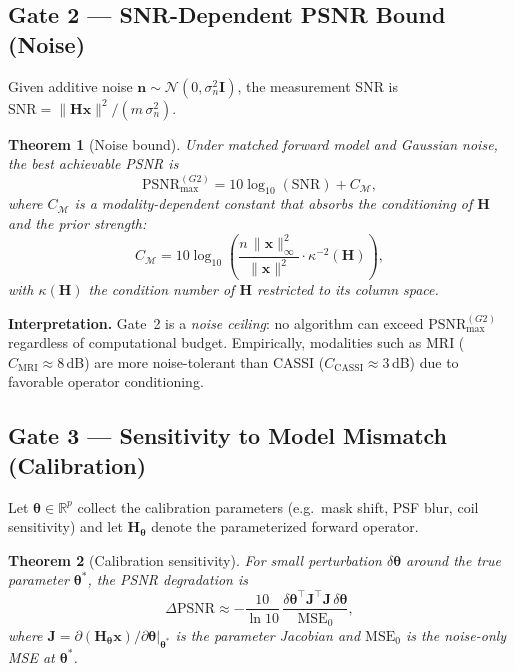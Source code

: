 \documentclass[11pt]{article}
\newtheorem{theorem}{Theorem}
\theoremstyle{definition}
\begin{document}
\subsection{Gate 2 --- SNR-Dependent PSNR Bound (Noise)}

Given additive noise $\mathbf{n}\sim\mathcal{N}(0,\sigma_n^2\mathbf{I})$,
the measurement SNR is $\mathrm{SNR} = \|\mathbf{H}\mathbf{x}\|^2 /
(m\,\sigma_n^2)$.

\begin{theorem}[Noise bound]
Under matched forward model and Gaussian noise, the best achievable PSNR is
\begin{equation}
  \mathrm{PSNR}_{\max}^{(G2)}
  = 10\log_{10}(\mathrm{SNR}) + C_{\mathcal{M}},
  \label{eq:gate2}
\end{equation}
where $C_{\mathcal{M}}$ is a modality-dependent constant that absorbs
the conditioning of $\mathbf{H}$ and the prior strength:
\begin{equation}
  C_{\mathcal{M}}
  = 10\log_{10}\!\left(
      \frac{n\,\|\mathbf{x}\|_\infty^2}{\|\mathbf{x}\|^2}
      \cdot \kappa^{-2}(\mathbf{H})
    \right),
\end{equation}
with $\kappa(\mathbf{H})$ the condition number of $\mathbf{H}$ restricted to
its column space.
\end{theorem}

\noindent\textbf{Interpretation.}
Gate~2 is a \emph{noise ceiling}: no algorithm can exceed
$\mathrm{PSNR}_{\max}^{(G2)}$ regardless of computational budget.
Empirically, modalities such as MRI ($C_{\mathrm{MRI}}\approx 8$\,dB) are more
noise-tolerant than CASSI ($C_{\mathrm{CASSI}}\approx 3$\,dB) due to
favorable operator conditioning.

\subsection{Gate 3 --- Sensitivity to Model Mismatch (Calibration)}

Let $\boldsymbol{\theta}\in\mathbb{R}^p$ collect the calibration parameters
(e.g.\ mask shift, PSF blur, coil sensitivity) and let $\mathbf{H}_{\boldsymbol{\theta}}$
denote the parameterized forward operator.

\begin{theorem}[Calibration sensitivity]
For small perturbation $\delta\boldsymbol{\theta}$ around the true parameter
$\boldsymbol{\theta}^*$, the PSNR degradation is
\begin{equation}
  \Delta\mathrm{PSNR}
  \approx -\frac{10}{\ln 10}\,
  \frac{\delta\boldsymbol{\theta}^\top
        \mathbf{J}^\top \mathbf{J}\,
        \delta\boldsymbol{\theta}}
       {\mathrm{MSE}_0},
  \label{eq:gate3}
\end{equation}
where $\mathbf{J} = \partial(\mathbf{H}_{\boldsymbol{\theta}}\mathbf{x})/
\partial\boldsymbol{\theta}\big|_{\boldsymbol{\theta}^*}$ is the parameter
Jacobian and $\mathrm{MSE}_0$ is the noise-only MSE at
$\boldsymbol{\theta}^*$.
\end{theorem}
\end{document}
